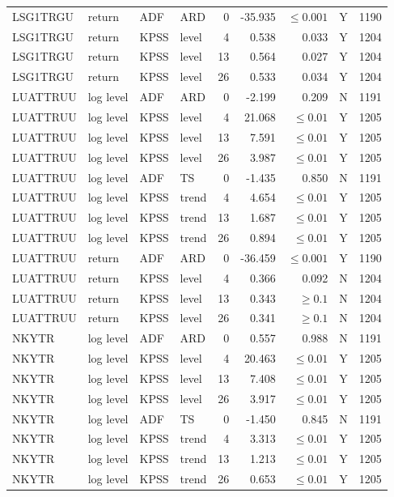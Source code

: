 {\begin{longtable}{@{}llllrrrrr@{}}
LSG1TRGU & return & ADF & ARD & 0 & -35.935 & $\leq 0.001$ & Y & 1190\\
LSG1TRGU & return & KPSS & level & 4 & 0.538 & 0.033 & Y & 1204\\
LSG1TRGU & return & KPSS & level & 13 & 0.564 & 0.027 & Y & 1204\\
LSG1TRGU & return & KPSS & level & 26 & 0.533 & 0.034 & Y & 1204\\
LUATTRUU & log level & ADF & ARD & 0 & -2.199 & 0.209 & N & 1191\\
LUATTRUU & log level & KPSS & level & 4 & 21.068 & $\leq 0.01$ & Y & 1205\\
LUATTRUU & log level & KPSS & level & 13 & 7.591 & $\leq 0.01$ & Y & 1205\\
LUATTRUU & log level & KPSS & level & 26 & 3.987 & $\leq 0.01$ & Y & 1205\\
LUATTRUU & log level & ADF & TS & 0 & -1.435 & 0.850 & N & 1191\\
LUATTRUU & log level & KPSS & trend & 4 & 4.654 & $\leq 0.01$ & Y & 1205\\
LUATTRUU & log level & KPSS & trend & 13 & 1.687 & $\leq 0.01$ & Y & 1205\\
LUATTRUU & log level & KPSS & trend & 26 & 0.894 & $\leq 0.01$ & Y & 1205\\
LUATTRUU & return & ADF & ARD & 0 & -36.459 & $\leq 0.001$ & Y & 1190\\
LUATTRUU & return & KPSS & level & 4 & 0.366 & 0.092 & N & 1204\\
LUATTRUU & return & KPSS & level & 13 & 0.343 & $\geq 0.1$ & N & 1204\\
LUATTRUU & return & KPSS & level & 26 & 0.341 & $\geq 0.1$ & N & 1204\\
NKYTR & log level & ADF & ARD & 0 & 0.557 & 0.988 & N & 1191\\
NKYTR & log level & KPSS & level & 4 & 20.463 & $\leq 0.01$ & Y & 1205\\
NKYTR & log level & KPSS & level & 13 & 7.408 & $\leq 0.01$ & Y & 1205\\
NKYTR & log level & KPSS & level & 26 & 3.917 & $\leq 0.01$ & Y & 1205\\
NKYTR & log level & ADF & TS & 0 & -1.450 & 0.845 & N & 1191\\
NKYTR & log level & KPSS & trend & 4 & 3.313 & $\leq 0.01$ & Y & 1205\\
NKYTR & log level & KPSS & trend & 13 & 1.213 & $\leq 0.01$ & Y & 1205\\
NKYTR & log level & KPSS & trend & 26 & 0.653 & $\leq 0.01$ & Y & 1205\\

\end{longtable}}
